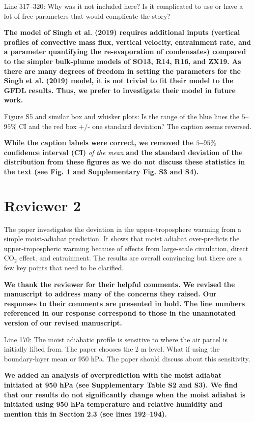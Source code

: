 \documentclass[11pt]{article}
\begin{document}
Line 317--320: Why was it not included here? Is it complicated to use or have a lot of free parameters that would complicate the story?

\textbf{The model of Singh et al. (2019) requires additional inputs (vertical profiles of convective mass flux, vertical velocity, entrainment rate, and a parameter quantifying the re-evaporation of condensates) compared to the simpler bulk-plume models of SO13, R14, R16, and ZX19. As there are many degrees of freedom in setting the parameters for the Singh et al. (2019) model, it is not trivial to fit their model to the GFDL results. Thus, we prefer to investigate their model in future work.}

Figure S5 and similar box and whisker plots: Is the range of the blue lines the \(5\)--\(95\%\) CI and the red box +/- one standard deviation? The caption seems reversed.

\textbf{While the caption labels were correct, we removed the \(5\)--\(95\%\) confidence interval (CI)} \emph{of the mean} \textbf{and the standard deviation of the distribution from these figures as we do not discuss these statistics in the text (see Fig. 1 and Supplementary Fig. S3 and S4).}

\newpage

\section*{Reviewer 2}
\label{sec:orgf14c331}

The paper investigates the deviation in the upper-troposphere warming from a simple moist-adiabat prediction. It shows that moist adiabat over-predicts the upper-tropospheric warming because of effects from large-scale circulation, direct CO\(_2\) effect, and entrainment. The results are overall convincing but there are a few key points that need to be clarified.

\textbf{We thank the reviewer for their helpful comments. We revised the manuscript to address many of the concerns they raised. Our responses to their comments are presented in bold. The line numbers referenced in our response correspond to those in the unannotated version of our revised manuscript.}

Line 170: The moist adiabatic profile is sensitive to where the air parcel is initially lifted from. The paper chooses the 2 m level. What if using the boundary-layer mean or 950 hPa. The paper should discuss about this sensitivity.

\textbf{We added an analysis of overprediction with the moist adiabat initiated at 950 hPa (see Supplementary Table S2 and S3). We find that our results do not significantly change when the moist adiabat is initiated using 950 hPa temperature and relative humidity and mention this in Section 2.3 (see lines 192--194).}
\end{document}
